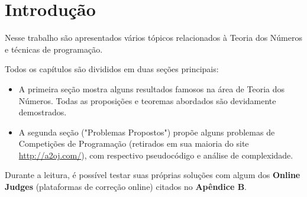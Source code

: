 
\chapter{Introdução} %

\label{Chapter1} %


Nesse trabalho são apresentados vários tópicos relacionados à Teoria dos Números e técnicas de programação.
\newline

Todos os capítulos são divididos em duas seções principais:

\begin{itemize}

\item A primeira seção mostra alguns resultados famosos na área de Teoria dos Números. Todas as proposições e teoremas abordados são devidamente demostrados.

\item A segunda seção ("Problemas Propostos") propõe alguns problemas de Competições de Programação (retirados em sua maioria do site \url{http://a2oj.com/}), com respectivo
pseudocódigo e análise de complexidade.

\end{itemize}

Durante a leitura, é possível testar suas próprias soluções com algum dos \textbf{Online Judges} (plataformas de correção online) citados no \textbf{Apêndice B}.


